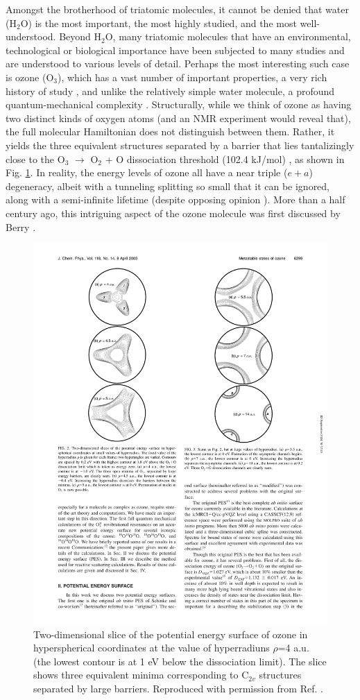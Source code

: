 \documentclass[12pt,prb,aps]{revtex4}
\begin{document}
Amongst the brotherhood of triatomic molecules, it cannot be denied that water
(H$_2$O) is the most important, the most highly studied, and the most
well-understood. Beyond H$_2$O, many triatomic molecules that have
an environmental, technological or biological importance have been subjected
to many studies and are understood to various levels of detail. Perhaps the
most interesting such case is ozone (O$_3$), which has a vast number of
important properties, a very rich history of study \cite{chappuis}, and 
unlike the relatively simple water molecule, a profound quantum-mechanical
complexity \cite{Babikov:anomalousOzone:2003}. Structurally, while
we think of ozone as having two distinct kinds of oxygen atoms (and an NMR experiment would reveal that), the full molecular Hamiltonian does not distinguish
between them. Rather, it yields the three equivalent structures separated by a
barrier that lies tantalizingly close to the O$_3$ $\rightarrow$ O$_2$ + O
dissociation threshold (102.4 kJ/mol) \cite{Ruscis:ATcT:2022}, as shown in 
Fig. \ref{fig:3fold}.
In reality, the
energy levels of ozone all have a near triple ($e+a$) degeneracy, albeit with
a tunneling splitting so small that it can be ignored, along with a
semi-infinite lifetime (despite opposing opinion
\cite{Boggs:BerryOzone:2006}). More than a half century ago, this intriguing
aspect of the ozone molecule was first discussed by Berry
\cite{Berry:Ozone:1960}.

\begin{figure}[h!]
\includegraphics[width = 8 cm]{./figures/OzonePES3fold.pdf}
\caption{Two-dimensional slice of the potential energy surface of ozone in hyperspherical coordinates at the value of hyperradiuns $\rho$=4 a.u. (the lowest contour is at 1 eV below the dissociation limit). The slice shows three equivalent minima corresponding to 
C$_{2v}$ structures separated by large barriers. 
Reproduced with permission from Ref. .
    \label{fig:3fold}}
\end{figure}
\end{document}

